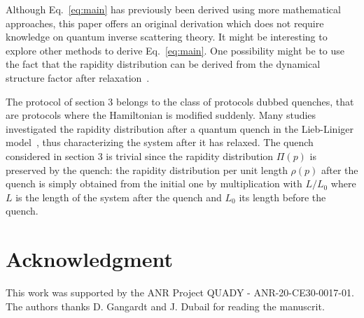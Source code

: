 \documentclass[submission,Phys,10pt]{SciPost}%
\begin{document}
Although %
Eq.~\eqref{eq:main}
has previously been derived using  more mathematical 
approaches, this paper offers an original derivation 
 which does not require knowledge on 
quantum inverse scattering theory. It might be interesting 
to explore other methods to derive Eq.~\eqref{eq:main}. One possibility might be to use  
the fact that the rapidity distribution can be derived from the dynamical structure factor
after relaxation~\cite{de_nardis_probing_2017}. 


The protocol of section 3 belongs to the class of protocols dubbed quenches, that are protocols where the Hamiltonian is modified suddenly. Many studies investigated the rapidity distribution after a quantum quench in the Lieb-Liniger model~\cite{caux_time_2013,nardis_relaxation_2015,de_nardis_solution_2014,piroli_multiparticle_2016}, thus characterizing the system after it has relaxed. The quench considered in section 3 is trivial  since the rapidity distribution $\Pi(p)$ is preserved by the quench:  the rapidity distribution per unit length $\rho(p)$ after the quench is simply obtained from the initial one by multiplication with $L/L_0$ where $L$ is the length of the system after the quench and $L_0$ its length before the quench. 

\section{Acknowledgment}
This work was
supported by the ANR Project QUADY -
ANR-20-CE30-0017-01. The authors thanks D. Gangardt and J. Dubail for 
reading the manuscrit. 

%

\end{document}
